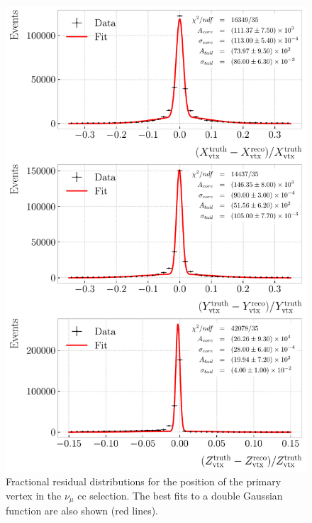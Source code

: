\begin{figure}[p!]
    \centering
    \includegraphics[width=.80\linewidth]{Images/GAr_selection/numuCC_muon_vtx_residuals.pdf}
    \caption[Fractional residual distributions for the position of the primary vertex in the $\nu_{\mu}$ \gls{cc} selection.]{Fractional residual distributions for the position of the primary vertex in the $\nu_{\mu}$ \gls{cc} selection. The best fits to a double Gaussian function are also shown (red lines).}
    \label{fig:numuCC_vertex_residuals}
\end{figure}

